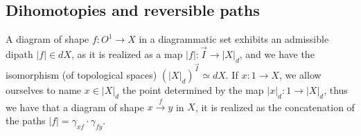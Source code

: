 
\subsection{Dihomotopies and reversible paths}
A diagram of shape \( f : O^1 \to X \) in a diagrammatic set exhibits an admissible dipath \( |f| \in dX \), as it is realized as a map \( |f| : \vec{I} \to |X|_d \), and we have the isomorphism (of topological spaces) \( (|X|_d)^{\vec{I}} \simeq dX \). If \( x : 1 \to X \), we allow ourselves to name \( x \in |X|_d \) the point determined by the map \( |x|_d : 1 \to |X|_d \), thus we have that a diagram of shape \( x \stackrel{f}{\to} y \) in \( X \), it is realized as the concatenation of the paths \( |f| = \gamma_{xf}\cdot\gamma_{fy} \).

